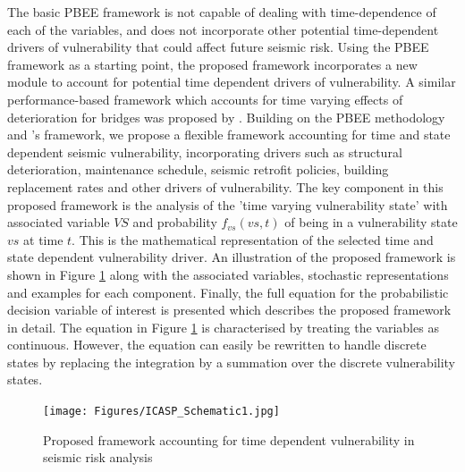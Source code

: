 The basic PBEE framework is not capable of dealing with time-dependence of each of the variables, and does not incorporate other potential time-dependent drivers of vulnerability that could affect future seismic risk.
Using the PBEE framework as a starting point, the proposed framework incorporates a new module to account for potential time dependent drivers of vulnerability. 
A similar performance-based framework which accounts for time varying effects of deterioration for bridges was proposed by \cite{rao2017development}. Building on the PBEE methodology and \cite{rao2017development}'s framework, we propose a flexible framework accounting for time and state dependent seismic vulnerability, incorporating drivers such as structural deterioration, maintenance schedule, seismic retrofit policies, building replacement rates and other drivers of vulnerability. 
The key component in this proposed framework is the analysis of the 'time varying vulnerability state' with associated variable $VS$ and probability $f_{vs}(vs,t)$ of being in a vulnerability state $vs$ at time $t$. This is the mathematical representation of the selected time and state dependent vulnerability driver. An illustration of the proposed framework is shown in Figure \ref{fig:schematic1} along with the associated variables, stochastic representations and examples for each component. Finally, the full equation for the probabilistic decision variable of interest is presented which describes the proposed framework in detail. 
The equation in Figure \ref{fig:schematic1} is characterised by treating the variables as continuous. However, the equation can easily be rewritten to handle discrete states by replacing the integration by a summation over the discrete vulnerability states.

\begin{figure}[h!]
  \centering
  \texttt{[image: Figures/ICASP\_Schematic1.jpg]}
  \caption{Proposed framework accounting for time dependent vulnerability in seismic risk analysis}
  \label{fig:schematic1}
\end{figure}  



